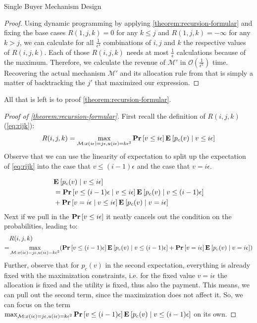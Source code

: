 \documentclass[11pt,a4paper]{article}
\renewcommand{\Pr}[1]{\mbox{\rm\bf Pr}\left[#1\right]}
\newcommand{\Ex}[2][]{\mbox{\rm\bf E}_{#1}\left[#2\right]}
\newcommand{\1}[1]{\mbox{\rm\bf 1}_{#1}}
\begin{document}
\begin{section}{Single Buyer Mechanism Design}
\begin{proof}
     Using dynamic programming by applying \autoref{theorem:recursion-formular} and fixing the base cases $R(1,j,k) = 0$ for any $k \leq j$ and $R(1,j,k)=-\infty$ for any $k > j$,
     we can calculate for all $\frac{1}{\epsilon^4}$ combinations of $i,j$ and $k$ the respective values of $R(i,j,k)$.
     Each of those $R(i,j,k)$ needs at most $\frac{1}{\epsilon}$ calculations because of the maximum.
     Therefore, we calculate the revenue of $\mathcal{M}'$ in $\mathcal{O}\left(\frac{1}{\epsilon^5}\right)$ time.
     Recovering the actual mechanism $\mathcal{M}'$ and its allocation rule from that is simply a matter of backtracking the $j'$ that maximized our expression.
 \end{proof}

 All that is left is to proof \autoref{theorem:recursion-formular}.
 \begin{proof}[Proof of \autoref{theorem:recursion-formular}]
     First recall the definition of $R(i,j,k)$ (\autoref{eq:rijk}):
     \begin{align*}
         R(i,j,k) = \max_{\mathcal{M}: x(i\epsilon) = j\epsilon, u(i\epsilon) = k \epsilon^2} \Pr{v \leq i\epsilon}\Ex{p_c(v)\mid v \leq i \epsilon}
     \end{align*}
     Observe that we can use the linearity of expectation to split up the expectation of \autoref{eq:rijk} into the case that $v \leq (i-1)\epsilon$ and the case that $v = i \epsilon$.

     \begin{align*}
          & \Ex{p_c(v)\mid v \leq i \epsilon}                                                           \\
          & = \Pr{v \leq (i-1)\epsilon \mid v \leq i \epsilon} \Ex{p_c(v) \mid v \leq (i - 1) \epsilon} \\
          & + \Pr{v = i \epsilon \mid v \leq i \epsilon} \Ex{p_c(v) \mid v = i \epsilon}
     \end{align*}
     Next if we pull in the $\Pr{v \leq i\epsilon}$ it neatly cancels out the condition on the probabilities, leading to:
     \begin{align*}
           & R(i,j,k)                                                                                                                                                                                             \\
         = & \max_{\mathcal{M}: x(i\epsilon) = j\epsilon, u(i\epsilon) = k \epsilon^2} (\Pr{v \leq (i-1)\epsilon} \Ex{p_c(v) \mid v \leq (i - 1) \epsilon} + \Pr{v = i \epsilon} \Ex{p_c(v) \mid v = i \epsilon})
     \end{align*}
     Further, observe that for $p_c(v)$ in the second expectation, everything is already fixed with the maximization constraints, i.e. for the fixed value $v = i \epsilon$ the allocation is fixed and the utility is fixed, thus also the payment.
     This means, we can pull out the second term, since the maximization does not affect it.
     So, we can focus on the term $\max_{\mathcal{M}: x(i\epsilon) = j\epsilon, u(i\epsilon)=k\epsilon^2} \Pr{v \leq (i-1)\epsilon} \Ex{p_c(v) \mid v \leq (i - 1) \epsilon}$ on its own.


\end{proof}
\end{section}
\end{document}
